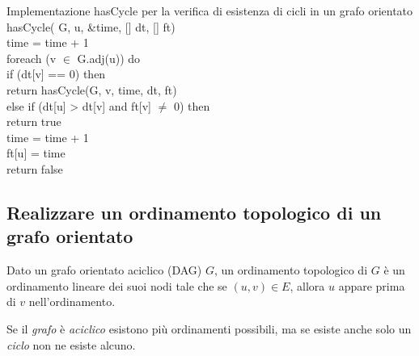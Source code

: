 \begin{minicode}{Implementazione hasCycle per la verifica di esistenza di cicli
    in un grafo orientato}
\ind{} hasCycle( G,  u,  \&time, [] dt, [] ft)\\
    time = time + 1\\
    \indf foreach (v $\in$ G.adj(u)) do\\
        \indff if (dt[v] == 0) then\\
            return hasCycle(G, v, time, dt, ft)\\
    \indff else if (dt[u] > dt[v] and ft[v] $\neq$ 0) then\\
        return true\\
    \indf time = time + 1\\
    \indf ft[u] = time\\
    \indf return false
\end{minicode}

\subsection{Realizzare un ordinamento topologico di un grafo orientato}
\begin{definition}
    Dato un grafo orientato aciclico (DAG) $G$, un ordinamento topologico di $G$
    è un ordinamento lineare dei suoi nodi tale che se $(u,v)\in E$, allora $u$
    appare prima di $v$ nell'ordinamento.
\end{definition}

\newpage
\begin{note}
    Se il \emph{grafo} è \emph{aciclico} esistono più ordinamenti possibili, ma
    se esiste anche solo un \emph{ciclo} non ne esiste alcuno.
\end{note}

